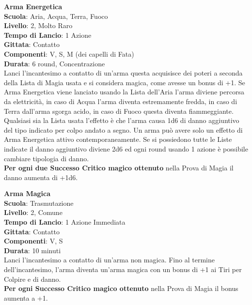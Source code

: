\begin{multicols}{2}
\medskip\textbf{Arma Energetica}\\
\textbf{Scuola}: Aria, Acqua, Terra, Fuoco\\
\textbf{Livello}: 2, Molto Raro\\
\textbf{Tempo di Lancio}: 1 Azione\\
\textbf{Gittata}: Contatto\\
\textbf{Componenti}: V, S, M (dei capelli di Fata)\\
\textbf{Durata}: 6 round, Concentrazione\\
Lanci l'incantesimo a contatto di un'arma questa acquisisce dei poteri a seconda della Lista di Magia usata e si considera magica, come avesse un bonus di +1.
Se Arma Energetica viene lanciato usando la Lista dell'Aria l'arma diviene percorsa da elettricità, in caso di Acqua l'arma diventa estremamente fredda, in caso di Terra dall'arma sgorga acido, in caso di Fuoco questa diventa fiammeggiante. Qualsiasi sia la Lista usata l'effetto è che l'arma causa 1d6 di danno aggiuntivo del tipo indicato per colpo andato a segno.
Un arma può avere solo un effetto di Arma Energetica attivo contemporaneamente.
Se si possiedono tutte le Liste indicate il danno aggiuntivo diviene 2d6 ed ogni round usando 1 azione è possibile cambiare tipologia di danno.\\
\textbf{Per ogni due Successo Critico magico ottenuto} nella Prova di Magia il danno aumenta di +1d6.

\medskip\textbf{Arma Magica}\\
\textbf{Scuola}: Trasmutazione\\
\textbf{Livello}: 2, Comune\\
\textbf{Tempo di Lancio}: 1 Azione Immediata\\
\textbf{Gittata}: Contatto\\
\textbf{Componenti}: V, S\\
\textbf{Durata}: 10 minuti\\
Lanci l'incantesimo a contatto di un'arma non magica. Fino al termine dell'incantesimo, l'arma diventa un'arma magica con un bonus di +1 ai Tiri per Colpire e di danno.\\
\textbf{Per ogni Successo Critico magico ottenuto} nella Prova di Magia il bonus aumenta a +1.


\end{multicols}
